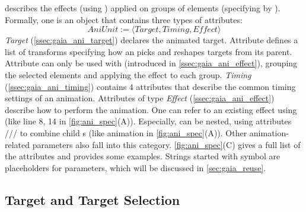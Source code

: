 \aniunit{} describes the effects (using ) applied on groups of elements (specifying by ). 
Formally, one \aniunit{} is an object that contains three types of attributes:
$$
AniUnit := \langle Target, Timing, Effect \rangle
$$
\textit{Target} (\autoref{ssec:gaia_ani_target}) declares the animated target.
Attribute  defines a list of transforms specifying how an \aniunit{} picks and reshapes targets from its parent.
Attribute  can only be used with  (introduced in \autoref{ssec:gaia_ani_effect}), grouping the selected elements and applying the effect to each group.
\textit{Timing} (\autoref{ssec:gaia_ani_timing}) contains 4 attributes that describe the common timing settings of an animation.
Attributes of type \textit{Effect} (\autoref{ssec:gaia_ani_effect}) describe how to perform the animation.
One \aniunit{} can refer to an existing effect using  (like line 8, 14 in \autoref{fig:ani_spec}(A)).
Especially, \aniunit{} can be nested, using attributes /// to combine child \aniunit{}s (like  animation in \autoref{fig:ani_spec}(A)).
Other animation-related parameters also fall into this category.
\autoref{fig:ani_spec}(C) gives a full list of the attributes and provides some examples.
Strings started with symbol \code{\$} are placeholders for parameters, which will be discussed in \autoref{sec:gaia_reuse}.


\subsection{Target and Target Selection}
\label{ssec:gaia_ani_target}


\begin{table}[]
	\caption{Target attributes}
	\vspace{-3mm}
	\label{tab:target}
	\vspace{-5mm}
\end{table}

